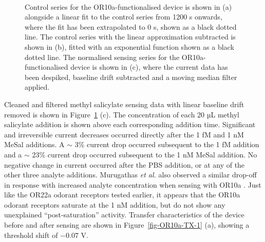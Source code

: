 \documentclass[
  a4paper,
]{scrbook}
\begin{document}
\begin{figure}
\begin{minipage}[t]{0.70\linewidth}
{{}

}

\end{minipage}%
%
\begin{minipage}[t]{0.15\linewidth}

{\centering 

~

}

\end{minipage}%

\caption[Control series for the OR10a-functionalised device alongside a
linear fitted curve, the control series with linear fit subtracted and
fitted with an exponential curve, and the normalised and filtered
sensing series for the OR10a-functionalised
device.]{\label{fig-OR10a-sensing}Control series for the
OR10a-functionalised device is shown in (a) alongside a linear fit to
the control series from 1200 s onwards, where the fit has been
extrapolated to 0 s, shown as a black dotted line. The control series
with the linear approximation subtracted is shown in (b), fitted with an
exponential function shown as a black dotted line. The normalised
sensing series for the OR10a-functionalised device is shown in (c),
where the current data has been despiked, baseline drift subtracted and
a moving median filter applied.}

\end{figure}

Cleaned and filtered methyl salicylate sensing data with linear baseline
drift removed is shown in Figure~\ref{fig-OR10a-sensing} (c). The
concentration of each 20 µL methyl salicylate addition is shown above
each corresponding addition time. Significant and irreversible current
decreases occurred directly after the 1 fM and 1 nM MeSal additions. A
\(\sim\) 3\% current drop occurred subsequent to the 1 fM addition and a
\(\sim\) 23\% current drop occurred subsequent to the 1 nM MeSal
addition. No negative change in current occurred after the PBS addition,
or at any of the other three analyte additions. Murugathas \emph{et al.}
also observed a similar drop-off in response with increased analyte
concentration when sensing with OR10a \autocite{Murugathas2019a}. Just
like the OR22a odorant receptors tested earlier, it appears that the
OR10a odorant receptors saturate at the 1 nM addition, but do not show
any unexplained ``post-saturation'' activity. Transfer characteristics
of the device before and after sensing are shown in
Figure~\ref{fig-OR10a-TX-1} (a), showing a threshold shift of \(-0.07\)
V.
\end{document}

